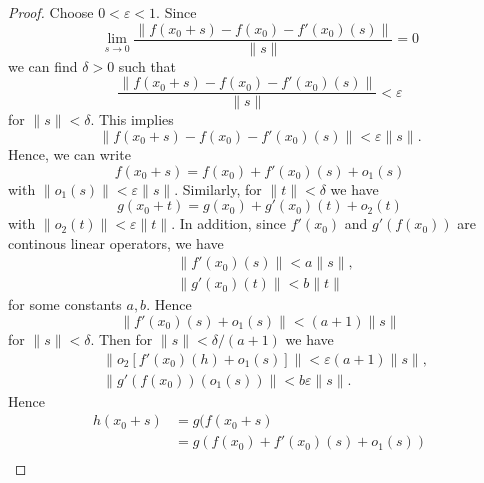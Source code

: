 \documentclass[12pt,reqno]{amsart}
\numberwithin{equation}{section}  %
\numberwithin{figure}{section}
\newcommand{\ee}{\varepsilon}
\theoremstyle{plain}
\theoremstyle{definition}
\theoremstyle{remark}
\begin{document}
  \begin{proof} Choose $0<\ee<1$. Since 
			\begin{equation*}
				\lim_{s \to 0} \frac{\|f (x_0 + s) - f(x_0) -
				f'(x_0)(s)\|}{\|s\|} = 0
			\end{equation*}
			we can find $\delta > 0$ such that 
			\begin{equation*}
				\frac{\|f (x_0 + s) - f(x_0) -
				f'(x_0)(s)\|}{\|s\|} < \ee
			\end{equation*}
			for $\|s\| < \delta$. This implies
			\begin{equation*}
				\|f(x_0 + s) - f(x_0) - f'(x_0)(s) \| < \ee \|s\|.
			\end{equation*}
			Hence, we can write
			\begin{equation*}
				f(x_0 + s) = f(x_0) + f'(x_0)(s) + o_{1}(s)
			\end{equation*}
			with $\|o_{1}(s)\| < \ee \|s\|$. Similarly, for $\|t\| <
			\delta$ we have 
			\begin{equation*}
				g(x_0 + t) = g(x_0) + g'(x_0)(t)+ o_{2}(t)
			\end{equation*}
			with $\|o_{2}(t)\| < \ee \|t\|$. In addition, since $f'(x_0)$
			and $g'(f(x_0))$ are continous linear operators, we have
			\begin{equation*}
				\begin{split}
					&\|f'(x_0)(s) \| < a \|s \|,
					\\
					&\|g'(x_0)(t) \| < b \|t \|
				\end{split}
			\end{equation*}
			for some constants $a , b$. Hence
			\begin{equation*}
				\|f'(x_0)(s) + o_{1}(s) \| < (a + 1) \|s\|
			\end{equation*}
			for $\|s\| < \delta$. Then for $\|s \| <
			\delta/(a+1)$ we have
			\begin{equation}
				\label{key_estimate}
				\begin{split}
					&\| o_{2} [f'(x_0)(h) + o_{1}(s)] \| < \ee(a+1)\|s \|,
					\\
					& \|g'(f(x_0))(o_{1}(s))\| < b \ee \|s\|.
				\end{split}
			\end{equation}
			Hence
			\begin{equation*}
				\begin{split}
					h(x_0 + s) &= g(f(x_0 +s)
					\\
					&= g(f(x_0) + f'(x_0)(s) + o_{1}(s))
					\\

\end{split}
\end{equation*}
\end{proof}
\end{document}
